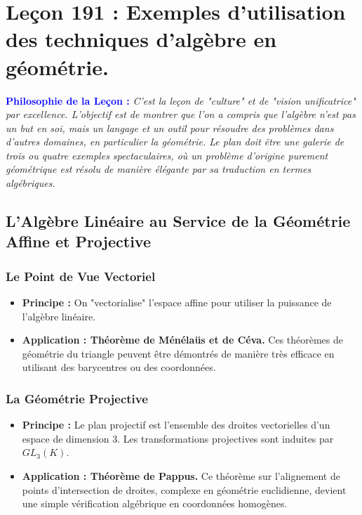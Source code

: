 \documentclass[12pt, a4paper, parskip=full]{report}
\theoremstyle{agregstyle}
\newenvironment{philosophie}
  {\par\medskip\noindent\begin{oframed}\noindent\textbf{\textcolor{blue}{Philosophie de la Leçon :}}\itshape}
  {\end{oframed}\par\medskip}
\begin{document}
\newpage
\chapter{Leçon 191 : Exemples d'utilisation des techniques d'algèbre en géométrie.}

\begin{philosophie}
    C'est la leçon de "culture" et de "vision unificatrice" par excellence. L'objectif est de montrer que l'on a compris que l'algèbre n'est pas un but en soi, mais un langage et un outil pour résoudre des problèmes dans d'autres domaines, en particulier la géométrie. Le plan doit être une galerie de trois ou quatre exemples spectaculaires, où un problème d'origine purement géométrique est résolu de manière élégante par sa traduction en termes algébriques.
\end{philosophie}

\section{L'Algèbre Linéaire au Service de la Géométrie Affine et Projective}
\subsection{Le Point de Vue Vectoriel}
\begin{itemize}
    \item \textbf{Principe :} On "vectorialise" l'espace affine pour utiliser la puissance de l'algèbre linéaire.
    \item \textbf{Application : Théorème de Ménélaüs et de Céva.} Ces théorèmes de géométrie du triangle peuvent être démontrés de manière très efficace en utilisant des barycentres ou des coordonnées.
\end{itemize}
\subsection{La Géométrie Projective}
\begin{itemize}
    \item \textbf{Principe :} Le plan projectif est l'ensemble des droites vectorielles d'un espace de dimension 3. Les transformations projectives sont induites par $GL_3(K)$.
    \item \textbf{Application : Théorème de Pappus.} Ce théorème sur l'alignement de points d'intersection de droites, complexe en géométrie euclidienne, devient une simple vérification algébrique en coordonnées homogènes.
\end{itemize}
\end{document}
